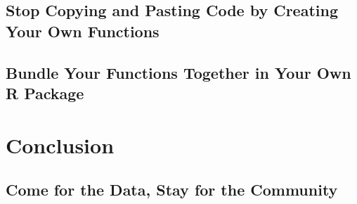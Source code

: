 \documentclass[
]{book}
\begin{document}
\hypertarget{stop-copying-and-pasting-code-by-creating-your-own-functions}{%
\chapter*{Stop Copying and Pasting Code by Creating Your Own Functions}\label{stop-copying-and-pasting-code-by-creating-your-own-functions}}

\hypertarget{bundle-your-functions-together-in-your-own-r-package}{%
\chapter*{Bundle Your Functions Together in Your Own R Package}\label{bundle-your-functions-together-in-your-own-r-package}}

\hypertarget{part-conclusion}{%
\part*{Conclusion}\label{part-conclusion}}

\hypertarget{come-for-the-data-stay-for-the-community}{%
\chapter*{Come for the Data, Stay for the Community}\label{come-for-the-data-stay-for-the-community}}
\end{document}
